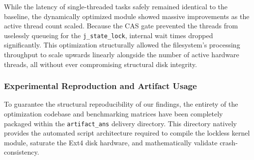 While the latency of single-threaded tasks safely remained identical to the baseline, the dynamically optimized module showed massive improvements as the active thread count scaled. Because the CAS gate prevented the threads from uselessly queueing for the \texttt{j\_state\_lock}, internal wait times dropped significantly. This optimization structurally allowed the filesystem's processing throughput to scale upwards linearly alongside the number of active hardware threads, all without ever compromising structural disk integrity.
\subsubsection{Experimental Reproduction and Artifact Usage}

To guarantee the structural reproducibility of our findings, the entirety of the optimization codebase and benchmarking matrices have been completely packaged within the \texttt{artifact\_ans} delivery directory. This directory natively provides the automated script architecture required to compile the lockless kernel module, saturate the Ext4 disk hardware, and mathematically validate crash-consistency.

